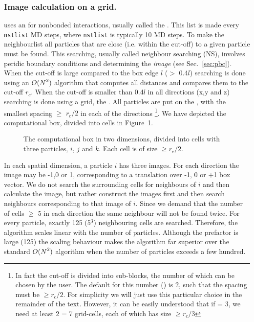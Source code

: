 \subsubsection{Image calculation on a grid.}
\label{sec:nsgrid}
{\gromacs} uses an  for nonbonded interactions,
usually called the {\em {}}.
This list is made every {\tt nstlist} MD steps, where {\tt nstlist} is
typically 10 MD steps. 
To make the neighbourlist all particles that are close 
(i.e. within the cut-off) to a given particle must be found.
This searching, usually called neighbour searching (NS), 
involves peridic boundary conditions and 
determining the {\em image} (see Sec.~\ref{sec:pbc}).
When the cut-off is large compared to the box edge $l$ ($>$ 0.4$l$)
searching is done using an $O({\mbox{$N$}}^2)$ algorithm that computes
all distances and compares them to the cut-off $r_c$.
When the cut-off is smaller than 0.4$l$ in all directions (x,y and z)
searching is done using a grid, the {\nsgrid}. All particles are put on 
the {\nsgrid},
with the smallest spacing  $\ge$ $r_c/2$ in each of the directions
\footnote{In fact the cut-off is divided into sub-blocks, the number of which
can be chosen by the user. The default for this number (\dgrid) is 2, 
such that the {\nsgrid} spacing must be $\ge r_c/2$. For 
simplicity we will just use this particular choice
in the remainder of the text. However, it can be easily understood that 
if {\dgrid} = 3, we need at least 2{\dgrid} = 7 grid-cells, 
each of which has size $\ge r_c/3$}.
We have depicted the computational box, divided into {\nsgrid} cells in 
Figure~\ref{fig:nsgrid}.
\begin{figure}
\centerline{}
\caption{The computational box in two dimensions, divided into {\nsgrid} cells with three particles, $i$, $j$ and $k$. Each {\nsgrid} cell is of size $\ge r_c/2$.}
\label{fig:nsgrid}
\end{figure}
In each spatial dimension, a particle $i$ has three images. For each direction
the image may be -1,0 or 1, corresponding to a translation over -1, 0 or +1
box vector. We do not search the surrounding {\nsgrid} cells for
neighbours of $i$ and then calculate the image, 
but rather construct the images first and then 
search neighbours corresponding to that image of $i$.
Since we demand that the number of {\nsgrid} cells $\ge$ 5 in each direction 
the same neighbour will not be found twice. For every particle, exactly 125 (5$^3$)
neighbouring cells are searched. Therefore, the algorithm scales linear with the 
number of particles. Although the prefactor is large (125) the scaling behaviour
makes the algorithm far superior over the standard $O({\mbox{$N$}}^2)$ 
algorithm when the number of particles exceeds a few hundred.


